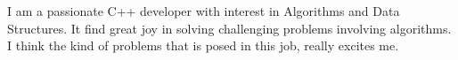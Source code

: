 \documentclass[11pt, a4paper]{awesome-cv}
\begin{document}
\begin{cvletter}
I am a passionate C++ developer with interest in Algorithms and Data Structures.
It find great joy in solving challenging problems involving algorithms. 
I think the kind of problems that is posed in this job, really excites me. 


\end{cvletter}


\makeletterclosing
\end{document}
